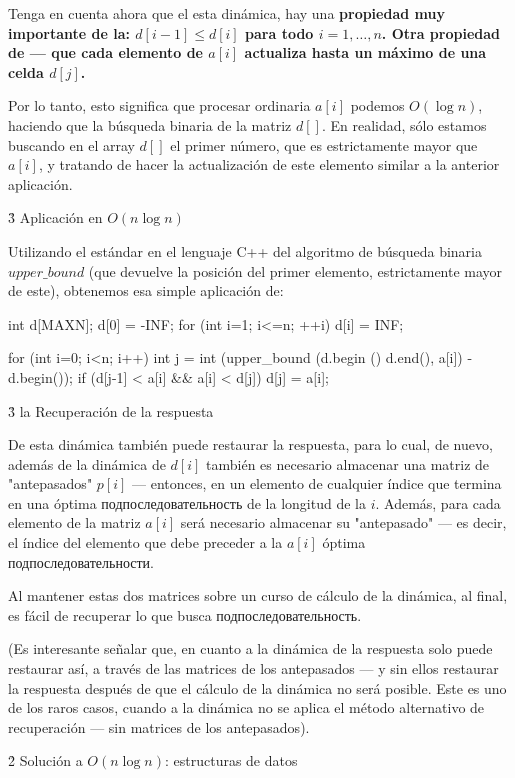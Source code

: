 Tenga en cuenta ahora que el esta dinámica, hay una \bf{propiedad muy importante de la}: $d[i-1] \le d[i]$ para todo $i = 1, \ldots, n$. Otra propiedad de --- que cada elemento de $a[i]$ actualiza hasta un máximo de una celda $d[j]$.

Por lo tanto, esto significa que procesar ordinaria $a[i]$ podemos $O (\log n)$, haciendo que la búsqueda binaria de la matriz $d[]$. En realidad, sólo estamos buscando en el array $d[]$ el primer número, que es estrictamente mayor que $a[i]$, y tratando de hacer la actualización de este elemento similar a la anterior aplicación.


\h3{ Aplicación en $O (n \log n)$ }

Utilizando el estándar en el lenguaje C++ del algoritmo de búsqueda binaria $upper\_bound$ (que devuelve la posición del primer elemento, estrictamente mayor de este), obtenemos esa simple aplicación de:

\code
int d[MAXN];
d[0] = -INF;
for (int i=1; i<=n; ++i)
d[i] = INF;

for (int i=0; i<n; i++) {
int j = int (upper_bound (d.begin () d.end(), a[i]) - d.begin());
if (d[j-1] < a[i] && a[i] < d[j])
d[j] = a[i];
}
\endcode


\h3{ la Recuperación de la respuesta }

De esta dinámica también puede restaurar la respuesta, para lo cual, de nuevo, además de la dinámica de $d[i]$ también es necesario almacenar una matriz de "antepasados" $p[i]$ --- entonces, en un elemento de cualquier índice que termina en una óptima подпоследовательность de la longitud de la $i$. Además, para cada elemento de la matriz $a[i]$ será necesario almacenar su "antepasado" --- es decir, el índice del elemento que debe preceder a la $a[i]$ óptima подпоследовательности.

Al mantener estas dos matrices sobre un curso de cálculo de la dinámica, al final, es fácil de recuperar lo que busca подпоследовательность.

(Es interesante señalar que, en cuanto a la dinámica de la respuesta solo puede restaurar así, a través de las matrices de los antepasados --- y sin ellos restaurar la respuesta después de que el cálculo de la dinámica no será posible. Este es uno de los raros casos, cuando a la dinámica no se aplica el método alternativo de recuperación --- sin matrices de los antepasados).



\h2{ Solución a $O (n \log n)$: estructuras de datos }


